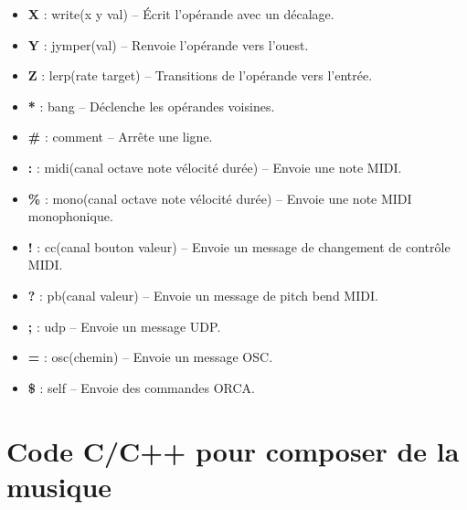 \documentclass[a4paper]{report}
\begin{document}
\begin{itemize}
\item \textbf{X} : write(x y val) -- Écrit l'opérande avec un décalage.
\item \textbf{Y} : jymper(val) -- Renvoie l'opérande vers l'ouest.
\item \textbf{Z} : lerp(rate target) -- Transitions de l'opérande vers l'entrée.
\item \textbf{*} : bang -- Déclenche les opérandes voisines.
\item \textbf{\#} : comment -- Arrête une ligne.
\item \textbf{:} : midi(canal octave note vélocité durée) -- Envoie une note MIDI.
\item \textbf{\%} : mono(canal octave note vélocité durée) -- Envoie une note MIDI monophonique.
\item \textbf{!} : cc(canal bouton valeur) -- Envoie un message de changement de contrôle MIDI.
\item \textbf{?} : pb(canal valeur) -- Envoie un message de pitch bend MIDI.
\item \textbf{;} : udp -- Envoie un message UDP.
\item \textbf{=} : osc(chemin) -- Envoie un message OSC.
\item \textbf{\$} : self -- Envoie des commandes ORCA.
\end{itemize}




\chapter{Code C/C++ pour composer de la musique}\label{appendix:codemidi}
\end{document}
